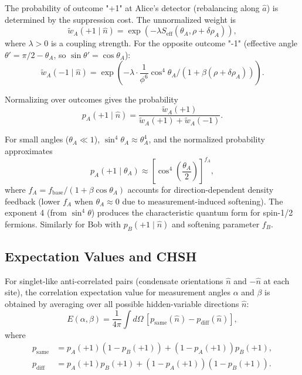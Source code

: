The probability of outcome "+1" at Alice's detector (rebalancing along $\hat{a}$) is determined by the suppression cost. The unnormalized weight is
\begin{equation}
\tilde{w}_A(+1 \mid \hat{n}) = \exp\left( -\lambda S_{\mathrm{eff}}(\theta_A, \rho + \delta\rho_A) \right),
\label{P8:eq:weight_plus}
\end{equation}
where $\lambda > 0$ is a coupling strength. For the opposite outcome "-1" (effective angle $\theta' = \pi/2 - \theta_A$, so $\sin\theta' = \cos\theta_A$):
\begin{equation}
\tilde{w}_A(-1 \mid \hat{n}) = \exp\left( -\lambda \cdot \frac{1}{\phi^6} \cos^4\theta_A \Big/ (1 + \beta (\rho + \delta\rho_A)) \right).
\label{P8:eq:weight_minus}
\end{equation}

Normalizing over outcomes gives the probability
\begin{equation}
p_A(+1 \mid \hat{n}) = \frac{\tilde{w}_A(+1)}{\tilde{w}_A(+1) + \tilde{w}_A(-1)}.
\label{P8:eq:prob_plus}
\end{equation}

For small angles ($\theta_A \ll 1$), $\sin^4\theta_A \approx \theta_A^4$, and the normalized probability approximates
\begin{equation}
p_A(+1 \mid \theta_A) \approx \left[ \cos^4\left(\frac{\theta_A}{2}\right) \right]^{f_A},
\label{P8:eq:prob_smallangle}
\end{equation}
where $f_A = f_{\mathrm{base}} / (1 + \beta \cos\theta_A)$ accounts for direction-dependent density feedback (lower $f_A$ when $\theta_A \approx 0$ due to measurement-induced softening). The exponent 4 (from $\sin^4\theta$) produces the characteristic quantum form for spin-1/2 fermions. Similarly for Bob with $p_B(+1 \mid \hat{n})$ and softening parameter $f_B$.

\subsection*{Expectation Values and CHSH}

For singlet-like anti-correlated pairs (condensate orientations $\hat{n}$ and $-\hat{n}$ at each site), the correlation expectation value for measurement angles $\alpha$ and $\beta$ is obtained by averaging over all possible hidden-variable directions $\hat{n}$:
\begin{equation}
E(\alpha, \beta) = \frac{1}{4\pi} \int d\Omega \, [p_{\mathrm{same}}(\hat{n}) - p_{\mathrm{diff}}(\hat{n})],
\label{P8:eq:E_expectation}
\end{equation}
where
\begin{align}
p_{\mathrm{same}} &= p_A(+1)(1 - p_B(+1)) + (1 - p_A(+1))p_B(+1), \\
p_{\mathrm{diff}} &= p_A(+1)p_B(+1) + (1 - p_A(+1))(1 - p_B(+1)).
\label{P8:eq:p_same_diff}
\end{align}

